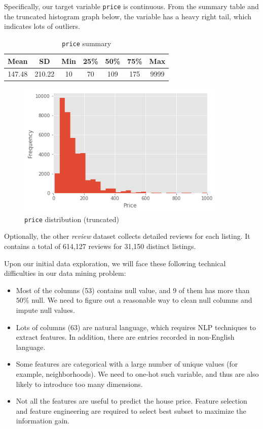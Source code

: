 \documentclass{article}
\begin{document}
	Specifically, our target variable \texttt{price} is continuous. From the summary table and the truncated histogram graph below, the variable has a heavy right tail, which indicates lots of outliers. 
	
	\begin{table}[h!]
		\centering
		\begin{tabular}{|c|c|c|c|c|c|c|}
			\hline
			Mean   & SD     & Min & 25\% & 50\% & 75\% & Max  \\ \hline
			147.48 & 210.22 & 10  & 70   & 109  & 175  & 9999 \\ \hline
		\end{tabular}
		\caption{\texttt{price} summary}
	\end{table}
	\begin{figure}[h!]
		\centering
		\includegraphics[width=10cm]{figure1}
		\caption{\texttt{price} distribution (truncated)}
	\end{figure}
	
	Optionally, the other \textit{review} dataset collects detailed reviews for each listing. It contains a total of 614,127 reviews for 31,150 distinct listings.
	
	Upon our initial data exploration, we will face these following technical difficulties in our data mining problem:
	\begin{itemize}
		\item Most of the columns (53) contains null value, and 9 of them has more than $50\%$ null. We need to figure out a reasonable way to clean null columns and impute null values.
		\item Lots of columns (63) are natural language, which requires NLP techniques to extract features. In addition, there are entries recorded in non-English language. 
		\item Some features are categorical with a large number of unique values (for example, neighborhoods). We need to one-hot such variable, and thus are also likely to introduce too many dimensions. 
		\item Not all the features are useful to predict the house price. Feature selection and feature engineering are required to select best subset to maximize the information gain. 
	\end{itemize}
	
\end{document}
